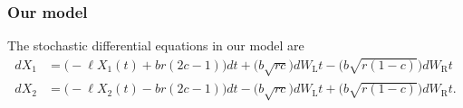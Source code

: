 \documentclass{article}
\newcommand{\mb}{\mathbf}
\begin{document}
%


\subsubsection{Our model }
The stochastic differential equations in our model are
\begin{equation}
\begin{array}{ll}
dX_1&=\bigg(-\ell X_1(t)+br(2c-1)\bigg)dt+\bigg(b\sqrt{rc}\bigg)dW_\text{L}t-\bigg(b\sqrt{r(1-c)}\bigg)dW_\text{R}t
\\dX_2&=\bigg(-\ell X_2(t)-br(2c-1)\bigg)dt-\bigg(b\sqrt{rc}\bigg)dW_\text{L}t+\bigg(b\sqrt{r(1-c)}\bigg)dW_\text{R}t.
\end{array}
\end{equation}
\end{document}
